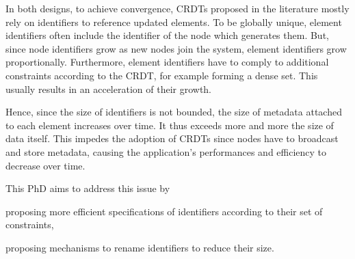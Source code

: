 \documentclass{article}
\begin{document}
In both designs, to achieve convergence, \acp{CRDT} proposed in the literature mostly rely on identifiers to reference updated elements.
To be globally unique, element identifiers often include the identifier of the node which generates them.
But, since node identifiers grow as new nodes join the system, element identifiers grow proportionally.
Furthermore, element identifiers have to comply to additional constraints according to the \ac{CRDT}, for example forming a dense set.
This usually results in an acceleration of their growth.



Hence, since the size of identifiers is not bounded, the size of metadata attached to each element increases over time.
It thus exceeds more and more the size of data itself.
This impedes the adoption of \acp{CRDT} since nodes have to broadcast and store metadata, causing the application's performances and efficiency to decrease over time.

This PhD aims to address this issue by
\begin{enumerate*}
  \item proposing more efficient specifications of identifiers according to their set of constraints,
  \item proposing mechanisms to rename identifiers to reduce their size.
\end{enumerate*}




\end{document}
